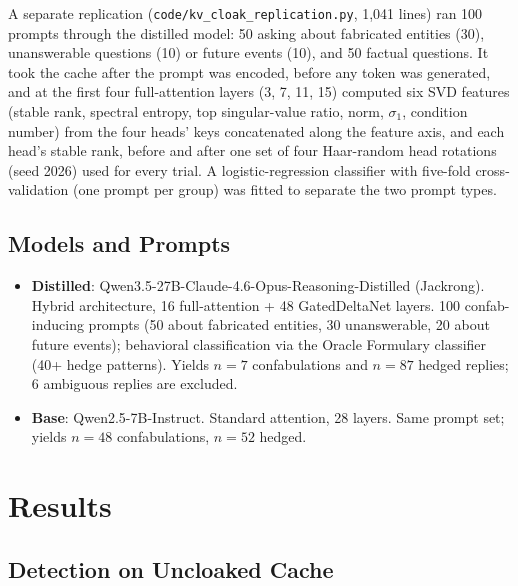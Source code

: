 \documentclass[11pt,a4paper]{article}
\begin{document}
A separate replication (\texttt{code/kv\_cloak\_replication.py},
1,041 lines) ran 100 prompts through the distilled model: 50 asking about
fabricated entities (30), unanswerable questions (10) or future events
(10), and 50 factual questions. It took the cache after the prompt was
encoded, before any token was generated, and at the first four
full-attention layers (3, 7, 11, 15) computed six SVD features (stable
rank, spectral entropy, top singular-value ratio, norm, $\sigma_1$,
condition number) from the four heads' keys concatenated along the
feature axis, and each head's stable rank, before and after one set of
four Haar-random head rotations (seed 2026) used for every trial. A
logistic-regression classifier with five-fold cross-validation (one
prompt per group) was fitted to separate the two prompt types.

\subsection{Models and Prompts}

\begin{itemize}
\item \textbf{Distilled}: Qwen3.5-27B-Claude-4.6-Opus-Reasoning-Distilled
(Jackrong). Hybrid architecture, 16 full-attention + 48 GatedDeltaNet
layers. 100 confab-inducing prompts (50 about fabricated entities, 30
unanswerable, 20 about future events); behavioral classification via the
Oracle Formulary classifier (40+ hedge patterns). Yields $n=7$
confabulations and $n=87$ hedged replies; 6 ambiguous replies are
excluded.

\item \textbf{Base}: Qwen2.5-7B-Instruct. Standard attention, 28
layers. Same prompt set; yields $n=48$ confabulations, $n=52$ hedged.
\end{itemize}

\section{Results}

\subsection{Detection on Uncloaked Cache}
\label{sec:uncloaked}
\end{document}
